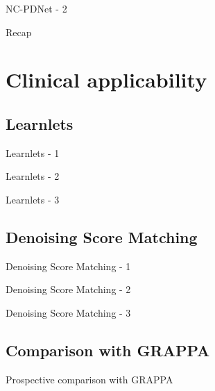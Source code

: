 \documentclass[aspectratio=169,xcolor=dvipsnames]{beamer}
\begin{document}
\begin{frame}{NC-PDNet - 2}
\end{frame}

\begin{frame}{Recap}
\end{frame}

\section{Clinical applicability}
\subsection{Learnlets}
\begin{frame}{Learnlets - 1}
\end{frame}

\begin{frame}{Learnlets - 2}
\end{frame}

\begin{frame}{Learnlets - 3}
\end{frame}

\subsection{Denoising Score Matching}
\begin{frame}{Denoising Score Matching - 1}
\end{frame}

\begin{frame}{Denoising Score Matching - 2}
\end{frame}

\begin{frame}{Denoising Score Matching - 3}
\end{frame}

\subsection{Comparison with GRAPPA}
\begin{frame}{Prospective comparison with GRAPPA}
\end{frame}
\end{document}
